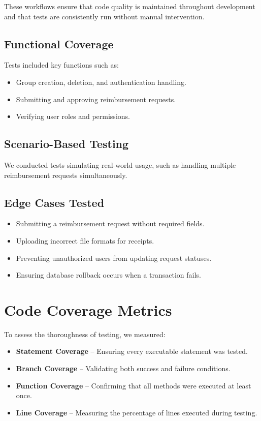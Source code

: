 \documentclass[12pt, titlepage]{article}
\begin{document}
These workflows ensure that code quality is maintained throughout development and that tests are consistently run without manual intervention.

\subsection*{Functional Coverage}
Tests included key functions such as:
\begin{itemize}
    \item Group creation, deletion, and authentication handling.
    \item Submitting and approving reimbursement requests.
    \item Verifying user roles and permissions.
\end{itemize}

\subsection*{Scenario-Based Testing}
We conducted tests simulating real-world usage, such as handling multiple reimbursement requests simultaneously.

\subsection*{Edge Cases Tested}
\begin{itemize}
    \item Submitting a reimbursement request without required fields.
    \item Uploading incorrect file formats for receipts.
    \item Preventing unauthorized users from updating request statuses.
    \item Ensuring database rollback occurs when a transaction fails.
\end{itemize}

\section*{Code Coverage Metrics}
To assess the thoroughness of testing, we measured:

\begin{itemize}
    \item \textbf{Statement Coverage} -- Ensuring every executable statement was tested.
    \item \textbf{Branch Coverage} -- Validating both success and failure conditions.
    \item \textbf{Function Coverage} -- Confirming that all methods were executed at least once.
    \item \textbf{Line Coverage} -- Measuring the percentage of lines executed during testing.
\end{itemize}
\end{document}
